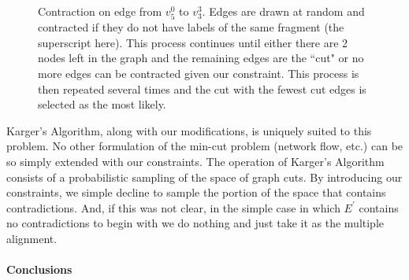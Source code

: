 \documentclass[11pt]{article}
\begin{document}
\begin{figure}[h!]
\begin{center}
\caption{Contraction on edge from $v^0_5$ to $v^3_3$. Edges are drawn at random and contracted if they do not have labels of the same fragment (the superscript here). This process continues until either there are 2 nodes left in the graph and the remaining edges are the ``cut" or no more edges can be contracted given our constraint. This process is then repeated several times and the cut with the fewest cut edges is selected as the most likely.}

\end{center}
\end{figure}


\par{
Karger's Algorithm, along with our modifications, is uniquely suited to this problem.  No other formulation of the min-cut problem (network flow, etc.) can be so simply extended with our constraints.  The operation of Karger's Algorithm consists of a probabilistic sampling of the space of graph cuts.  By introducing our constraints, we simple decline to sample the portion of the space that contains contradictions.  And, if this was not clear, in the simple case in which $E^\prime$ contains no contradictions to begin with we do nothing and just take it as the multiple alignment.  
}


\paragraph{Conclusions\newline}

\par{

}





\end{document}
